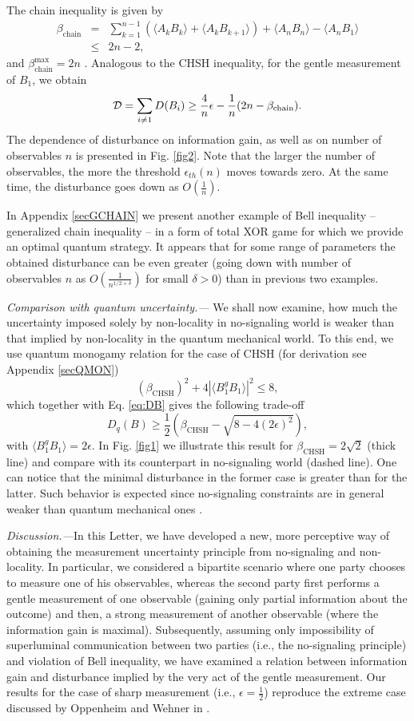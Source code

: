 \documentclass[pra,twocolumn,showpacs,preprintnumbers,amsmath,amssymb,superscriptaddress]{revtex4-1}
\def\be{\begin{equation}}
\def\ee{\end{equation}}
\def\ben{\begin{eqnarray}}
\def\een{\end{eqnarray}}
\def\>{\rangle}
\def\<{\langle}
\def\omeas{B_1}
\def\ogentle{B_1^g}
\def\chsh{\beta_{\text{CHSH}}}
\def\chain{\beta_{\text{chain}}}
\def\chainMax{\beta^{\max}_{\text{chain}}}
\def\dist{{\cal D}}
\begin{document}
The chain inequality \cite{BraunsteinCaves1990} is given by
\ben
\label{eq:chain}
\chain &=& \sum_{k=1}^{n-1}  (\< A_k B_k\> + \<A_k B_{k+1}\>) + \< A_n B_n\> - \<A_n B_1\> \nonumber \\
&\leq& 2n-2,
\een
and $\chainMax=2n$ .
Analogous to the CHSH inequality, for the gentle measurement of $\omeas$, we obtain
\be\label{eq:exchain}
{\dist} = \sum_{i\not= 1}D(B_i) \geq \frac{4}{n} \epsilon - \frac{1}{n} (2n- \chain).
\ee
The dependence of disturbance on information gain, as well as on number of observables $n$ is presented
in Fig. \ref{fig2}. Note that the larger the number of observables, the more the threshold $\epsilon_{th}(n)$ moves towards
zero. At the same time, the disturbance goes down as $O(\frac1n)$.

In Appendix \ref{secGCHAIN} we present another example of Bell inequality -- generalized chain inequality -- in a form of total XOR game for which we provide an optimal quantum strategy. It appears that for some range of parameters the obtained disturbance can be even greater (going down with number of observables $n$ as $O(\frac{1}{n^{1/2+\delta}})$ for small $\delta > 0$) than in previous two examples.


\textit{Comparison with quantum uncertainty.---}
We shall now examine, how much the uncertainty imposed solely by non-locality  in no-signaling world is weaker than that implied by non-locality in the quantum mechanical world. To this end, we use quantum monogamy relation for the case of CHSH (for derivation see Appendix \ref{secQMON})
\be
\label{eq:qmonCHSH}
\left(\chsh \right)^2 + 4 |\<\ogentle \omeas\>|^2 \leq 8,
\ee
which together with Eq. \eqref{eq:DB} gives the following trade-off
\be
D_{q}(B)\geq \frac12 \left(\chsh - \sqrt{8- 4(2\epsilon)^2}\right) ,
\ee
with $\<\ogentle \omeas\>=2 \epsilon$. In Fig. \ref{fig1} we illustrate this result for $\chsh=2 \sqrt{2}$ (thick line) and compare with its counterpart in no-signaling world (dashed line). One can notice that the minimal disturbance in the former case is greater than for the latter. Such behavior is expected since no-signaling constraints are in general weaker than quantum mechanical ones \cite{MassarPironio2005}.


\textit{Discussion.---}In this Letter, we have developed a new, more perceptive way of obtaining the measurement uncertainty principle from no-signaling and non-locality. 
In particular, we considered a bipartite scenario where one party chooses to measure one of his observables, whereas the second party first performs a gentle measurement of one observable (gaining only partial information about the outcome) and then, a strong measurement of another observable (where the information gain is maximal). Subsequently, assuming only impossibility of superluminal communication between two parties (i.e., the no-signaling principle) and violation of Bell inequality, we have examined a relation between information gain and disturbance implied by the very act of the gentle measurement. 
Our results for the case of sharp measurement (i.e., $\epsilon=\frac12$) reproduce the extreme case discussed by Oppenheim and Wehner in \cite{OppenheimWehner2010}.
\end{document}
